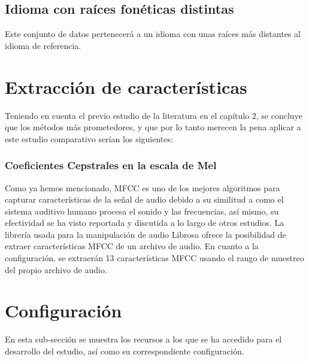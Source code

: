 \documentclass[11pt,a4paper,spanish]{book}
\begin{document}
	
	\subsection{Idioma con raíces fonéticas distintas} Este conjunto de datos pertenecerá a un idioma con unas raíces más distantes al idioma de referencia.\\
	
	
	\section{Extracción de características}
	\label{sec:extraccion_cap4}
	Teniendo en cuenta el previo estudio de la literatura en el capítulo 2, se concluye que los métodos más prometedores, y que por lo tanto merecen la pena aplicar a este estudio comparativo serían los siguientes:
	\subsubsection{Coeficientes Cepstrales en la escala de Mel}
	Como ya hemos mencionado, MFCC es uno de los mejores algoritmos para capturar características de la señal de audio debido a su similitud a como el sistema auditivo humano procesa el sonido y las frecuencias, así mismo, su efectividad se ha visto reportada y discutida a lo largo de otros estudios.
	La librería usada para la manipulación de audio Librosa ofrece la posibilidad de extraer características MFCC de un archivo de audio. En cuanto a la configuración, se extraerán 13 características MFCC usando el rango de muestreo del propio archivo de audio.
	

	

	\section{Configuración}
	En esta sub-sección se muestra los recursos a los que se ha accedido para el desarrollo del estudio, así como su correspondiente configuración.

	
\end{document}

